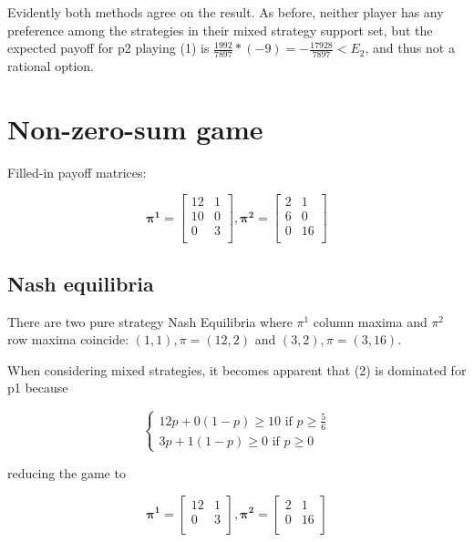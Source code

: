 \documentclass[12pt, a4paper]{article}
\begin{document}
Evidently both methods agree on the result. As before, neither player has any preference among the strategies in their mixed strategy support set, but the expected payoff for p2 playing (1) is $\frac{1992}{7897}*(-9)=-\frac{17928}{7897}<E_2$, and thus not a rational option.

\newpage
\section{Non-zero-sum game}

Filled-in payoff matrices:

\begin{equation}
    \boldsymbol{\pi^1}=\begin{bmatrix}
        12 & 1 \\
        10 & 0 \\
        0 & 3 \\ 
    \end{bmatrix},
    \boldsymbol{\pi^2}=\begin{bmatrix}
        2 & 1 \\
        6 & 0 \\
        0 & 16 \\ 
    \end{bmatrix}
\end{equation}

\subsection{Nash equilibria}

There are two pure strategy Nash Equilibria where $\pi^1$ column maxima and $\pi^2$ row maxima coincide: $(1,1), \pi=(12,2)$ and $(3,2), \pi=(3,16)$. 

When considering mixed strategies, it becomes apparent that (2) is dominated for p1 because

\begin{equation}
\begin{cases}
    12p + 0(1-p) \geq 10 \text{ if } p \geq \frac{5}{6} \\
    3p + 1(1-p) \geq 0 \text{ if } p \geq 0
\end{cases}
\end{equation}

reducing the game to 

\begin{equation}
    \boldsymbol{\pi^1}=\begin{bmatrix}
        12 & 1 \\
        0 & 3 \\ 
    \end{bmatrix},
    \boldsymbol{\pi^2}=\begin{bmatrix}
        2 & 1 \\
        0 & 16 \\ 
    \end{bmatrix}
\end{equation}
\end{document}
